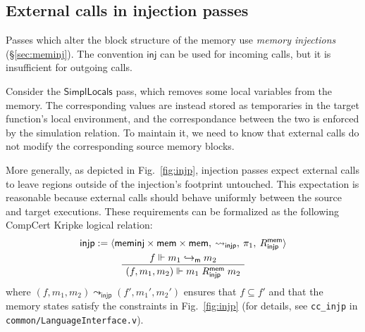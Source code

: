 \documentclass[acmsmall,screen,review,anonymous]{acmart}
\newcommand{\kw}[1]{\ensuremath{ \mathsf{#1} }}
\begin{document}

\subsection{External calls in injection passes} \label{sec:injp} %

Passes which alter the block structure of the memory
use \emph{memory injections} (\S\ref{sec:meminj}).
The convention \kw{inj} can be used for incoming calls,
but it is insufficient for outgoing calls.

Consider the \kw{SimplLocals} pass,
which removes some local variables %
from the memory.
The corresponding values are instead stored
as temporaries in the target function's local environment,
and the correspondance between the two
is enforced by the simulation relation.
To maintain it,
we need to know that
external calls do not modify
the corresponding source memory blocks.

More generally,
as depicted in Fig.~\ref{fig:injp},
injection passes expect external calls
to leave regions outside of the injection's footprint untouched.
This expectation is reasonable because
external calls
should behave uniformly between the source and target executions.
These requirements can be formalized as the
following CompCert Kripke logical relation:
\begin{gather*}
  \kw{injp} :=
    \langle
      \kw{meminj} \times \kw{mem} \times \kw{mem}, \:
      {\leadsto_\kw{injp}}, \:
      \pi_1, \:
      R^\kw{mem}_\kw{injp}
    \rangle
  \\
  \AxiomC{$f \Vdash m_1 \hookrightarrow_\kw{m} m_2$}
  \UnaryInfC{$(f, m_1, m_2) \Vdash m_1 \mathrel{R^\kw{mem}_\kw{injp}} m_2$}
  \DisplayProof
\end{gather*}
where $(f, m_1, m_2) \leadsto_\kw{injp} (f', m_1', m_2')$
ensures that $f \subseteq f'$ and that the memory states
satisfy the constraints in Fig.~\ref{fig:injp}
(for details,
see \texttt{cc\_injp} in \texttt{common/LanguageInterface.v}).
\end{document}
